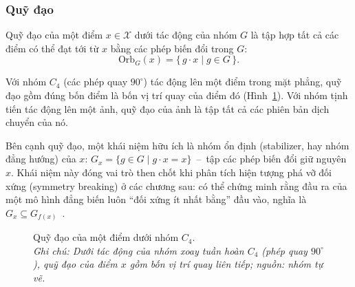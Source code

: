\subsubsection{Quỹ đạo}
\label{ssub:orbit}
 
\begin{definition}
\label{def:quy-dao}
Quỹ đạo của một điểm $x\in\mathcal{X}$ dưới tác động của nhóm $G$ là tập
hợp tất cả các điểm có thể đạt tới từ $x$ bằng các phép biến đổi trong $G$:
\begin{equation}
\label{eq:orbit}
\mathrm{Orb}_{G}(x) = \{\, g\cdot x \mid g\in G \,\}.
\end{equation}
\end{definition}
 
\begin{example}
\label{vd:orbit}
Với nhóm $C_{4}$ (các phép quay $90^{\circ}$) tác động lên một điểm trong mặt
phẳng, quỹ đạo gồm đúng bốn điểm là bốn vị trí quay của điểm đó
(Hình~\ref{fig:orbit}). Với nhóm tịnh tiến tác động lên một ảnh, quỹ đạo của ảnh
là tập tất cả các phiên bản dịch chuyển của nó.
\end{example}
 
\begin{remark}
Bên cạnh quỹ đạo, một khái niệm hữu ích là nhóm ổn định (stabilizer, hay
nhóm đẳng hướng) của $x$: $G_{x}=\{g\in G \mid g\cdot x = x\}$~--~tập các phép
biến đổi giữ nguyên $x$. Khái niệm này đóng vai trò then chốt khi phân tích hiện
tượng phá vỡ đối xứng (symmetry breaking) ở các chương sau: có thể chứng
minh rằng đầu ra của một mô hình đẳng biến luôn ``đối xứng ít nhất bằng'' đầu vào,
nghĩa là $G_{x}\subseteq G_{f(x)}$~\cite{wang2024symmetry}.
\end{remark}
 
\begin{figure}[H]
\centering
{}
\caption[Quỹ đạo của một điểm dưới nhóm $C_4$]{Quỹ đạo của một điểm dưới nhóm $C_4$.\protect\\[2pt]
\textit{Ghi chú: Dưới tác động của nhóm xoay tuần hoàn $C_4$ (phép quay $90^{\circ}$), quỹ đạo của điểm $x$ gồm bốn vị trí quay liên tiếp; nguồn: nhóm tự vẽ.}}
\label{fig:orbit}
\end{figure}
 
